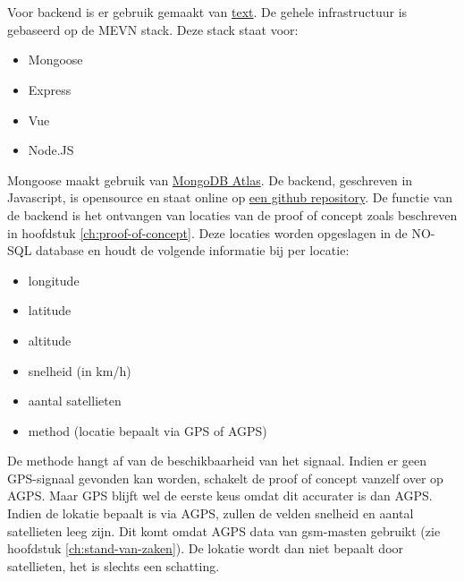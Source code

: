 \chapter{}
\label{ch:backend}

\section{}
Voor backend is er gebruik gemaakt van \href{URL}{text}. De gehele infrastructuur is gebaseerd op de MEVN stack.
Deze stack staat voor:
\begin{itemize}
	\item Mongoose
	\item Express
	\item Vue
	\item Node.JS
\end{itemize}
Mongoose maakt gebruik van \href{https://www.mongodb.com/cloud/atlas}{MongoDB Atlas}. De backend, geschreven in Javascript, is opensource en staat online op \href{https://github.com/IndyVC/bap-backend}{een github repository}.
\newline
De functie van de backend is het ontvangen van locaties van de proof of concept zoals beschreven in hoofdstuk \ref{ch:proof-of-concept}. Deze locaties worden opgeslagen in de NO-SQL database en houdt de volgende informatie bij per locatie:
\begin{itemize}
	\item longitude
	\item latitude
	\item altitude
	\item snelheid (in km/h)
	\item aantal satellieten
	\item method (locatie bepaalt via GPS of AGPS)
\end{itemize}
De methode hangt af van de beschikbaarheid van het signaal. Indien er geen GPS-signaal gevonden kan worden, schakelt de proof of concept vanzelf over op AGPS. Maar GPS blijft wel de eerste keus omdat dit accurater is dan AGPS. Indien de lokatie bepaalt is via AGPS, zullen de velden snelheid en aantal satellieten leeg zijn. Dit komt omdat AGPS data van gsm-masten gebruikt (zie hoofdstuk \ref{ch:stand-van-zaken}). De lokatie wordt dan niet bepaalt door satellieten, het is slechts een schatting. 

